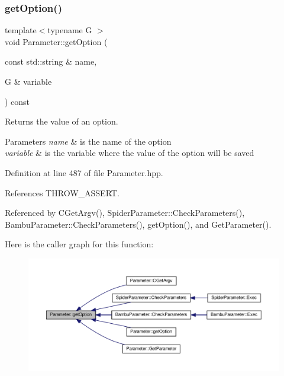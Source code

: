 \subsubsection{\texorpdfstring{get\+Option()}{getOption()}\hspace{0.1cm}{\footnotesize\ttfamily [1/8]}}
{\footnotesize\ttfamily template$<$typename G $>$ \\
void Parameter\+::get\+Option (\begin{DoxyParamCaption}\item[{const std\+::string \&}]{name,  }\item[{G \&}]{variable }\end{DoxyParamCaption}) const\hspace{0.3cm}{\ttfamily [inline]}}



Returns the value of an option. 


\begin{DoxyParams}{Parameters}
{\em name} & is the name of the option \\
\hline
{\em variable} & is the variable where the value of the option will be saved \\
\hline
\end{DoxyParams}


Definition at line 487 of file Parameter.\+hpp.



References T\+H\+R\+O\+W\+\_\+\+A\+S\+S\+E\+RT.



Referenced by C\+Get\+Argv(), Spider\+Parameter\+::\+Check\+Parameters(), Bambu\+Parameter\+::\+Check\+Parameters(), get\+Option(), and Get\+Parameter().

Here is the caller graph for this function\+:
\nopagebreak
\begin{figure}[H]
\begin{center}
\leavevmode
\includegraphics[width=350pt]{dc/dab/classParameter_adab70e796e929df46142e2be9cdd1145_icgraph}
\end{center}
\end{figure}
\mbox{\label{classParameter_afac47b8594298a92cd3a7348c124d526}} 
